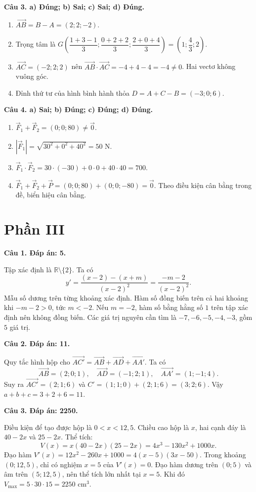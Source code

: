 \documentclass[12pt,a4paper]{article}
\newcommand{\loigiai}[1]{\par\medskip\Needspace{4\baselineskip}\noindent\textbf{#1}\par\nobreak}
\begin{document}
\loigiai{Câu 3. a) Đúng; b) Sai; c) Sai; d) Đúng.}
\begin{enumerate}[label=\alph*),leftmargin=*,itemsep=4pt]
\item $\overrightarrow{AB}=B-A=(2;2;-2)$.
\item Trọng tâm là $G\left(\dfrac{1+3-1}3;\dfrac{0+2+2}3;\dfrac{2+0+4}3\right)=\left(1;\dfrac43;2\right)$.
\item $\overrightarrow{AC}=(-2;2;2)$ nên
$\overrightarrow{AB}\cdot\overrightarrow{AC}=-4+4-4=-4\ne0$. Hai vectơ không vuông góc.
\item Đỉnh thứ tư của hình bình hành thỏa $D=A+C-B=(-3;0;6)$.
\end{enumerate}

\loigiai{Câu 4. a) Sai; b) Đúng; c) Đúng; d) Đúng.}
\begin{enumerate}[label=\alph*),leftmargin=*,itemsep=4pt]
\item $\vec F_1+\vec F_2=(0;0;80)\ne\vec0$.
\item $|\vec F_1|=\sqrt{30^2+0^2+40^2}=50$ N.
\item $\vec F_1\cdot\vec F_2=30\cdot(-30)+0\cdot0+40\cdot40=700$.
\item $\vec F_1+\vec F_2+\vec P=(0;0;80)+(0;0;-80)=\vec0$. Theo điều kiện cân bằng trong đề, biển hiệu cân bằng.
\end{enumerate}

\newpage
\section*{\large Phần III}
\loigiai{Câu 1. Đáp án: 5.}
Tập xác định là $\mathbb R\setminus\{2\}$. Ta có
\[
y'=\frac{(x-2)-(x+m)}{(x-2)^2}=\frac{-m-2}{(x-2)^2}.
\]
Mẫu số dương trên từng khoảng xác định. Hàm số đồng biến trên cả hai khoảng khi $-m-2>0$, tức $m<-2$.
Nếu $m=-2$, hàm số bằng hằng số $1$ trên tập xác định nên không đồng biến.
Các giá trị nguyên cần tìm là $-7,-6,-5,-4,-3$, gồm $5$ giá trị.

\loigiai{Câu 2. Đáp án: 11.}
Quy tắc hình hộp cho
$\overrightarrow{AC'}=\overrightarrow{AB}+\overrightarrow{AD}+\overrightarrow{AA'}$.
Ta có
\[
\overrightarrow{AB}=(2;0;1),\quad
\overrightarrow{AD}=(-1;2;1),\quad
\overrightarrow{AA'}=(1;-1;4).
\]
Suy ra $\overrightarrow{AC'}=(2;1;6)$ và $C'=(1;1;0)+(2;1;6)=(3;2;6)$.
Vậy $a+b+c=3+2+6=11$.

\loigiai{Câu 3. Đáp án: 2250.}
Điều kiện để tạo được hộp là $0<x<12{,}5$. Chiều cao hộp là $x$, hai cạnh đáy là $40-2x$ và $25-2x$.
Thể tích:
\[
V(x)=x(40-2x)(25-2x)=4x^3-130x^2+1000x.
\]
Đạo hàm $V'(x)=12x^2-260x+1000=4(x-5)(3x-50)$.
Trong khoảng $(0;12{,}5)$, chỉ có nghiệm $x=5$ của $V'(x)=0$.
Đạo hàm dương trên $(0;5)$ và âm trên $(5;12{,}5)$, nên thể tích lớn nhất tại $x=5$.
Khi đó $V_{\max}=5\cdot30\cdot15=2250$ cm$^3$.
\end{document}
